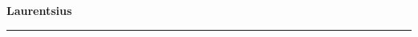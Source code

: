 \documentclass[10pt]{book}
\begin{document}
{
  \samepage
  \raggedbottom
  \raggedright
  \sloppy


  \vspace{0.2in}

  \noindent\begin{minipage}{.1\textwidth}
    \hfill\vspace{0.1in}
  \end{minipage}%
  \noindent\begin{minipage}{.8\textwidth}
    \centering
    \bfseries
    \large Laurentsius
  \end{minipage}%
  \noindent\begin{minipage}{.1\textwidth}
      \hfill\vspace{0.1in}
  \end{minipage}

  \nopagebreak[4]
  \vspace{0.1in}
  \nopagebreak[4]
  \hrule height 0.05ex
  \nopagebreak[4]
  \vspace{-0.05in}




}
\end{document}
